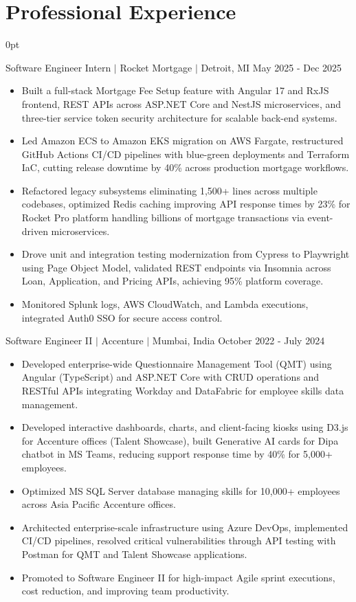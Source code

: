\documentclass[letterpaper,10pt]{article}
\newlength{\contentindent}
\newcommand{\sectioncontent}[1]{%
  \begin{adjustwidth}{\contentindent}{0pt}%
  #1%
  \end{adjustwidth}%
}
\begin{document}
\section{Professional Experience}
\sectioncontent{
Software Engineer Intern $|$ Rocket Mortgage $|$ Detroit, MI \hfill May 2025 - Dec 2025
\begin{itemize}
    \item Built a full-stack Mortgage Fee Setup feature with Angular 17 and RxJS frontend, REST APIs across ASP.NET Core and NestJS microservices, and three-tier service token security architecture for scalable back-end systems.
    \item Led Amazon ECS to Amazon EKS migration on AWS Fargate, restructured GitHub Actions CI/CD pipelines with blue-green deployments and Terraform IaC, cutting release downtime by 40\% across production mortgage workflows.
    \item Refactored legacy subsystems eliminating 1,500+ lines across multiple codebases, optimized Redis caching improving API response times by 23\% for Rocket Pro platform handling billions of mortgage transactions via event-driven microservices.
    \item Drove unit and integration testing modernization from Cypress to Playwright using Page Object Model, validated REST endpoints via Insomnia across Loan, Application, and Pricing APIs, achieving 95\% platform coverage.
    \item Monitored Splunk logs, AWS CloudWatch, and Lambda executions, integrated Auth0 SSO for secure access control.
\end{itemize}

Software Engineer II $|$ Accenture $|$ Mumbai, India \hfill October 2022 - July 2024
\begin{itemize}
    \item Developed enterprise-wide Questionnaire Management Tool (QMT) using Angular (TypeScript) and ASP.NET Core with CRUD operations and RESTful APIs integrating Workday and DataFabric for employee skills data management.
    \item Developed interactive dashboards, charts, and client-facing kiosks using D3.js for Accenture offices (Talent Showcase), built Generative AI cards for Dipa chatbot in MS Teams, reducing support response time by 40\% for 5,000+ employees.
    \item Optimized MS SQL Server database managing skills for 10,000+ employees across Asia Pacific Accenture offices.
    \item Architected enterprise-scale infrastructure using Azure DevOps, implemented CI/CD pipelines, resolved critical vulnerabilities through API testing with Postman for QMT and Talent Showcase applications.
    \item Promoted to Software Engineer II for high-impact Agile sprint executions, cost reduction, and improving team productivity.
\end{itemize}
}
\end{document}
